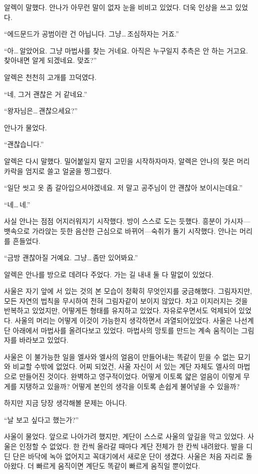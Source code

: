 알렉이 말했다. 안나가 아무런 말이 없자 눈을 비비고 있었다. 더욱 인상을 쓰고 있었다.

``에드문드가 공범이란 건 아닙니다. 그냥\ldots\,조심하자는 거죠.''

``아\ldots\,알았어요. 그냥 마법사를 찾는 거네요. 아직은 누구일지 추측은 안 하는 거고요. 찾아내면 알게 되겠네요. 맞죠?''

알렉은 천천히 고개를 끄덕였다.

``네, 그거 괜찮은 거 같네요.''

``왕자님은\ldots\,괜찮으세요?''

안나가 물었다.

``괜찮습니다.''

알렉은 다시 말했다. 밀어붙일지 말지 고민을 시작하자마자, 알렉은 안나의 젖은 머리카락을 엄지로 쓸고 얼굴을 찡그렸다.

``일단 씻고 옷 좀 갈아입으셔야겠네요. 저 말고 공주님이 안 괜찮아 보이시는데요.''

``네\ldots\,네.''

사실 안나는 점점 어지러워지기 시작했다. 방이 스스로 도는 듯했다. 흥분이 가시자—뱃속으로 가라앉는 듯한 음산한 근심으로 바뀌어—숙취가 돌기 시작했다. 안나는 머리를 흔들었다.

``금방 괜찮아질 거예요. 그냥\ldots\,좀만 있어봐요.''

알렉은 안나를 방으로 데려다 주었다. 가는 길 내내 둘 다 말없이 있었다.

\textbreak

사울은 자기 앞에 서 있는 것의 본 모습이 정확히 무엇인지를 궁금해했다. 그림자지만, 모든 자연의 법칙을 무시하여 전혀 그림자같이 보이지 않았다. 차고 이지러지는 것을 반복하고 있었지만, 어떻게든 형태를 유지하고 있었다. 자유로우면서도 억제되어 있었다. 사울의 머리는 어떻게 이것이 가능한지 생각하면서 과열되어있었다. 사울은 나선계단 아래에서 마법사를 올려다보고 있었다. 마법사의 망토를 만드는 계속 움직이는 그림자를 바라보고 있었다.

사울은 이 불가능한 일을 엘사와 엘사의 얼음이 만들어내는 똑같이 믿을 수 없는 묘기와 비교할 수밖에 없었다. 어찌 되었건, 사울 자신이 서 있는 계단 자체도 엘사의 마법으로 만들어진 것이다. 완벽하고 영구적이었다. 어떻게 이토록 얇은 얼음이 이렇게 무게를 지탱하고 있을까? 어떻게 본인의 생각을 이토록 손쉽게 불어넣을 수 있을까?

하지만 지금 당장 생각해볼 문제는 아니다.

``날 보고 싶다고 했는가?''

사울이 물었다. 앞으로 나아가려 했지만, 계단이 스스로 사울의 앞길을 막고 있었다. 사울은 인정할 수 없었다. 한 칸씩 올라갈 때마다 계단 전체가 한 칸씩 내려왔다. 발을 디딘 단은 바닥에 녹아 없어지고 꼭대기에서 새로운 단이 생겼다. 사울은 처음 자리로 돌아왔다. 더 빠르게 움직이면 계단도 똑같이 빠르게 움직일 뿐이었다.

